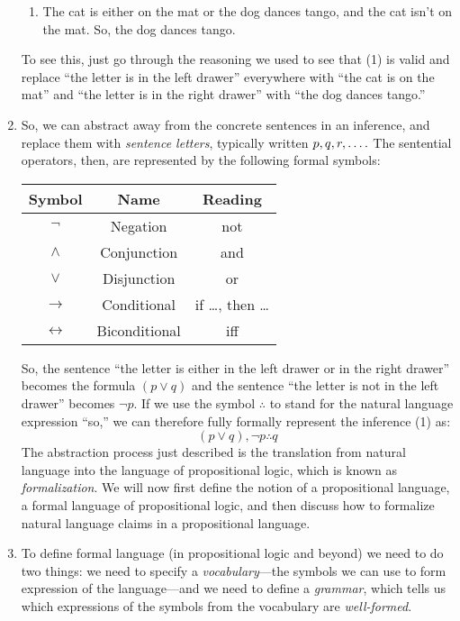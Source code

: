 \begin{enumerate}[\thesection.1]
\begin{enumerate}[(1')]
			\item The cat is either on the mat or the dog dances tango, and the cat isn't on the mat. So, the dog dances tango.
		
		\end{enumerate}
To see this, just go through the reasoning we used to see that (1) is valid and replace ``the letter is in the left drawer'' everywhere with ``the cat is on the mat'' and ``the letter is in the right drawer'' with ``the dog dances tango.'' 

\item So, we can abstract away from the concrete sentences in an inference, and replace them with \emph{sentence letters}, typically written $p,q,r,\mathellipsis.$ The sentential operators, then, are represented by the following formal symbols: 
		\begin{center}
			\begin{tabular}{c | c | c}
			Symbol & Name & Reading\\ \hline
			
			$\neg$ & Negation & not\\
			$\land$ & Conjunction & and\\
			$\lor$ & Disjunction & or\\
			$\to$ & Conditional & if \dots, then \dots\\
			$\leftrightarrow$ & Biconditional & iff
			\end{tabular}
		\end{center}
So, the sentence ``the letter is either in the left drawer or in the right drawer'' becomes the formula $(p\lor q)$ and the sentence ``the letter is not in the left drawer'' becomes $\neg p$. If we use the symbol $\therefore$ to stand for the natural language expression ``so,'' we can therefore fully formally represent the inference (1) as:
 	\[(p\lor q),\neg p\therefore q\]
The abstraction process just described is the translation from natural language into the  language of propositional logic, which is known as \emph{formalization}. We will now first define the notion of a propositional language, a formal language of propositional logic, and then discuss how to formalize natural language claims in a propositional language.

		\item To define formal language (in propositional logic and beyond) we need to do two things: we need to specify a \emph{vocabulary}---the symbols we can use to form expression of the language---and we need to define a \emph{grammar}, which tells us which expressions of the symbols from the vocabulary are \emph{well-formed}.
		

\end{enumerate}

